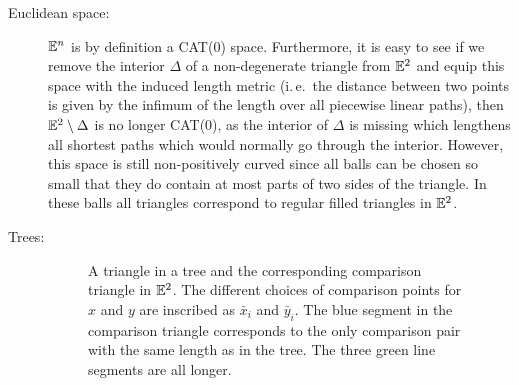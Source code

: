 \begin{bsp}
  \begin{description}
  \item[Euclidean space:] \(\mathbb{E}^n\) is by definition a CAT(0) space. Furthermore, it is easy to see if we remove the interior \(\Delta\) of a non-degenerate triangle from \(\mathbb{E}^2\) and equip this space with the induced length metric (i.\,e.\ the distance between two points is given by the infimum of the length over all piecewise linear paths), then \(\mathbb{E}^2 \setminus \Delta\) is no longer CAT(0), as the interior of \(\Delta\) is missing which lengthens all shortest paths which would normally go through the interior. However, this space is still non-positively curved since all balls can be chosen so small that they do contain at most parts of two sides of the triangle. In these balls all triangles correspond to regular filled triangles in \(\mathbb{E}^2\).
  \item[Trees:]
    \begin{figure}[htbp]
      \centering
      
      \caption{A triangle in a tree and the corresponding comparison triangle in \(\mathbb{E}^2\). The different choices of comparison points for \(x\) and \(y\) are inscribed as \(\bar x_i\) and \(\bar y_i\). The blue segment in the comparison triangle corresponds to the only comparison pair with the same length as in the tree. The three green line segments are all longer.}
      \label{fig:cat-tree}
    \end{figure}

\end{description}
\end{bsp}
